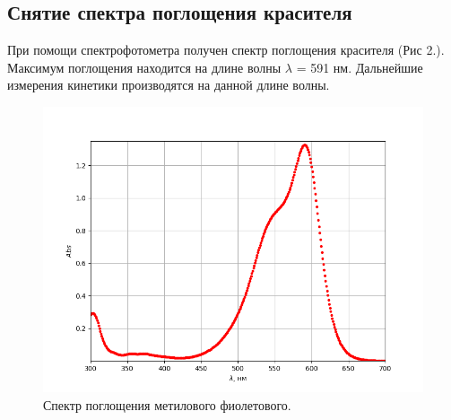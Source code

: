 \documentclass[a4paper,12pt]{article}
\begin{document}
\subsection{Снятие спектра поглощения красителя}

При помощи спектрофотометра получен спектр поглощения красителя (Рис 2.). Максимум поглощения находится на длине волны $\lambda$ = 591 нм. Дальнейшие измерения кинетики производятся на данной длине волны.

\begin{figure}[h!]
\begin{center}
\includegraphics[width = 0.72\linewidth]{Figure_1.png}
\end{center}
\caption{Спектр поглощения метилового фиолетового.}
\end{figure}

\newpage
\end{document}
